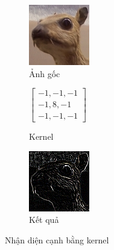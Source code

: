 \documentclass[12pt]{extreport}
\begin{document}
\begin{figure}[H]
    \centering
    \begin{subfigure}[H]{0.35\textwidth}
        \centering
        \includegraphics[width=0.5\linewidth]{figure7.png}
        \caption{Ảnh gốc}
    \end{subfigure}
    \begin{subfigure}[H]{0.25\textwidth}
        \centering
        \begin{math}
            \begin{bmatrix}
                -1, -1, -1 \\
                -1, 8, -1  \\
                -1, -1, -1
            \end{bmatrix}
        \end{math}
        \caption{Kernel}
    \end{subfigure}
    \begin{subfigure}[H]{0.35\textwidth}
        \centering
        \includegraphics[width=0.5\linewidth]{figure8.png}
        \caption{Kết quả}
    \end{subfigure}
    \caption{Nhận diện cạnh bằng kernel}
\end{figure}
\end{document}

